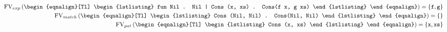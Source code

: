 \begin{example}
\label{ex:free-variables1}
\begin{eqnarray*}[c]
  \FV_{exp} \left( 
    \begin{eqnalign}[Tl]
\begin{lstlisting}
fun Nil . Nil
  | Cons (x, xs) . Cons(f x, g xs)
\end{lstlisting}
    \end{eqnalign}
  \right) = \{\ttt{f}, \ttt{g} \} \\
%
  \FV_{match} \left( 
    \begin{eqnalign}[Tl]
\begin{lstlisting}
Cons (Nil, Nil) . Cons(Nil, Nil)
\end{lstlisting}
    \end{eqnalign}
  \right) = \{\} \\
%
  \FV_{pat} \left( 
    \begin{eqnalign}[Tl]
\begin{lstlisting}
Cons (x, xs)
\end{lstlisting}
    \end{eqnalign}
  \right) = \{\ttt{x}, \ttt{xs}\} \\
\end{eqnarray*}
\end{example}



